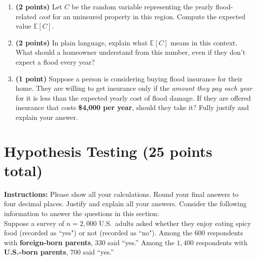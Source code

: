 \documentclass{article}
\newcommand{\blankbox}[2][3cm]{%
    \vspace{-0.5em}
    \begin{figure}[H]
        \makebox[\linewidth]{%
            \begin{tcolorbox}[
                colback=white, 
                colframe=white,  %
                width=#2, %
                height=#1,
                boxrule=0.2mm
            ]
            \end{tcolorbox}
        }
    \end{figure}
    \vspace{-2em}
}
\begin{document}
\begin{enumerate}
\item \textbf{(2 points)} Let $C$ be the random variable representing the yearly flood-related \emph{cost} for an uninsured property in this region. Compute the expected value $\mathbb{E}[C]$. \blankbox[6cm]{1.0\linewidth}

\item \textbf{(2 points)} In plain language, explain what $\mathbb{E}[C]$ means in this context. What should a homeowner understand from this number, even if they don’t expect a flood every year? \blankbox[5cm]{1.0\linewidth}

\item \textbf{(1 point)} Suppose a person is considering buying flood insurance for their home. They are willing to get insurance only if the \emph{amount they pay each year} for it is less than the expected yearly cost of flood damage. If they are offered insurance that costs \textbf{\$4,000 per year}, should they take it? Fully justify and explain your answer. %
\end{enumerate}

\newpage

\section{Hypothesis Testing (25 points total)}
\noindent\textbf{Instructions:} Please show all your calculations. Round your final answers to four decimal places. Justify and explain all your answers. Consider the following information to answer the questions in this section: \\

Suppose a survey of $n = 2{,}000$ U.S.\ adults asked whether they enjoy eating spicy food (recorded as ``yes") or not (recorded as ``no"). Among the $600$ respondents with \textbf{foreign-born parents}, $330$ said “yes.” Among the $1{,}400$ respondents with \textbf{U.S.-born parents}, $700$ said “yes.”
\end{document}
